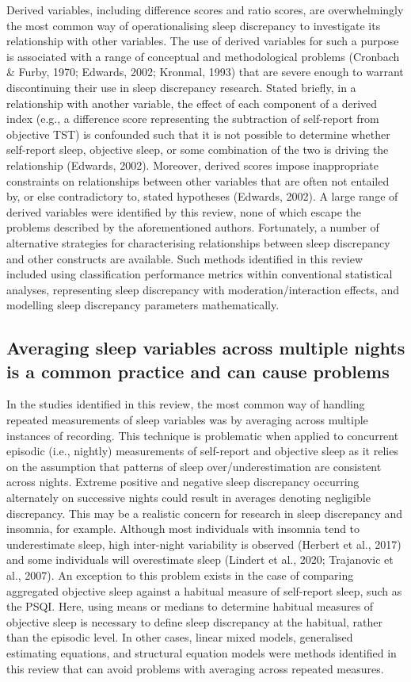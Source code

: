 \documentclass[
]{article}
\begin{document}
Derived variables, including difference scores and ratio scores, are overwhelmingly the most common way of operationalising sleep discrepancy to investigate its relationship with other variables. The use of derived variables for such a purpose is associated with a range of conceptual and methodological problems (Cronbach \& Furby, 1970; Edwards, 2002; Kronmal, 1993) that are severe enough to warrant discontinuing their use in sleep discrepancy research. Stated briefly, in a relationship with another variable, the effect of each component of a derived index (e.g., a difference score representing the subtraction of self-report from objective TST) is confounded such that it is not possible to determine whether self-report sleep, objective sleep, or some combination of the two is driving the relationship (Edwards, 2002). Moreover, derived scores impose inappropriate constraints on relationships between other variables that are often not entailed by, or else contradictory to, stated hypotheses (Edwards, 2002). A large range of derived variables were identified by this review, none of which escape the problems described by the aforementioned authors. Fortunately, a number of alternative strategies for characterising relationships between sleep discrepancy and other constructs are available. Such methods identified in this review included using classification performance metrics within conventional statistical analyses, representing sleep discrepancy with moderation/interaction effects, and modelling sleep discrepancy parameters mathematically.

\subsection{Averaging sleep variables across multiple nights is a common practice and can cause problems}\label{averaging}

In the studies identified in this review, the most common way of handling repeated measurements of sleep variables was by averaging across multiple instances of recording. This technique is problematic when applied to concurrent episodic (i.e., nightly) measurements of self-report and objective sleep as it relies on the assumption that patterns of sleep over/underestimation are consistent across nights. Extreme positive and negative sleep discrepancy occurring alternately on successive nights could result in averages denoting negligible discrepancy. This may be a realistic concern for research in sleep discrepancy and insomnia, for example. Although most individuals with insomnia tend to underestimate sleep, high inter-night variability is observed (Herbert et al., 2017) and some individuals will overestimate sleep (Lindert et al., 2020; Trajanovic et al., 2007). An exception to this problem exists in the case of comparing aggregated objective sleep against a habitual measure of self-report sleep, such as the PSQI. Here, using means or medians to determine habitual measures of objective sleep is necessary to define sleep discrepancy at the habitual, rather than the episodic level. In other cases, linear mixed models, generalised estimating equations, and structural equation models were methods identified in this review that can avoid problems with averaging across repeated measures.
\end{document}
